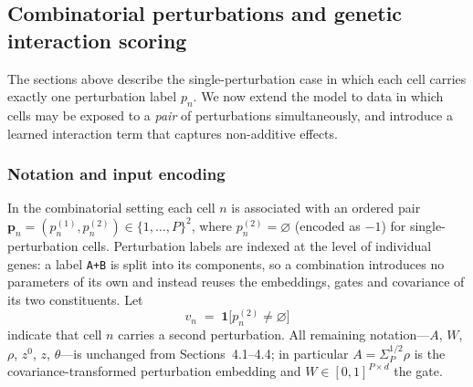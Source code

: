 %

\subsection{Combinatorial perturbations and genetic interaction scoring}
\label{sec:combo}

The sections above describe the single-perturbation case in which each cell carries exactly one
perturbation label $p_n$. We now extend the model to data in which cells may be exposed to a
\emph{pair} of perturbations simultaneously, and introduce a learned interaction term that captures
non-additive effects.

\subsubsection{Notation and input encoding}
\label{sec:combo-notation}

In the combinatorial setting each cell $n$ is associated with an ordered pair
$\mathbf{p}_n = (p_n^{(1)}, p_n^{(2)}) \in \{1,\dots,P\}^2$, where $p_n^{(2)} = \varnothing$
(encoded as $-1$) for single-perturbation cells. Perturbation labels are indexed at the level of
individual genes: a label \texttt{A+B} is split into its components, so a combination introduces no
parameters of its own and instead reuses the embeddings, gates and covariance of its two
constituents. Let
\[
  v_n \;=\; \mathbf{1}\big[p_n^{(2)} \neq \varnothing\big]
\]
indicate that cell $n$ carries a second perturbation. All remaining notation---$A$, $W$, $\rho$,
$z^0$, $z$, $\theta$---is unchanged from Sections~4.1--4.4; in particular $A = \Sigma_P^{1/2}\rho$ is
the covariance-transformed perturbation embedding and $W \in [0,1]^{P\times d}$ the gate.

